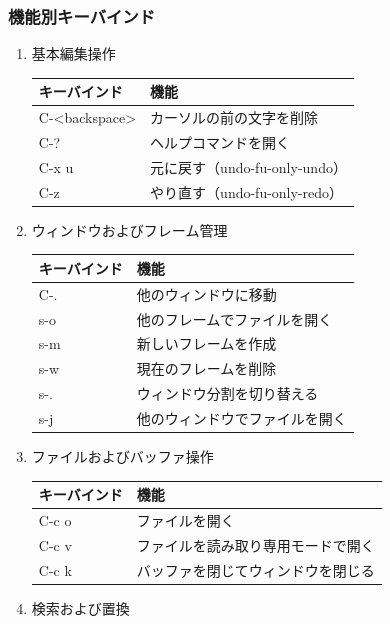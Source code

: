 \documentclass[11pt]{article}
\begin{document}
\subsubsection{機能別キーバインド}
\label{sec:orgd5e7649}
\begin{enumerate}
\item 基本編集操作
\label{sec:org70be987}
\begin{center}
\begin{tabular}{ll}
キーバインド & 機能\\
\hline
C-<backspace> & カーソルの前の文字を削除\\
C-? & ヘルプコマンドを開く\\
C-x u & 元に戻す（undo-fu-only-undo）\\
C-z & やり直す（undo-fu-only-redo）\\
\end{tabular}
\end{center}
\item ウィンドウおよびフレーム管理
\label{sec:org8e58915}
\begin{center}
\begin{tabular}{ll}
キーバインド & 機能\\
\hline
C-. & 他のウィンドウに移動\\
s-o & 他のフレームでファイルを開く\\
s-m & 新しいフレームを作成\\
s-w & 現在のフレームを削除\\
s-. & ウィンドウ分割を切り替える\\
s-j & 他のウィンドウでファイルを開く\\
\end{tabular}
\end{center}
\item ファイルおよびバッファ操作
\label{sec:orgfbdea40}
\begin{center}
\begin{tabular}{ll}
キーバインド & 機能\\
\hline
C-c o & ファイルを開く\\
C-c v & ファイルを読み取り専用モードで開く\\
C-c k & バッファを閉じてウィンドウを閉じる\\
\end{tabular}
\end{center}
\item 検索および置換
\label{sec:org4764bd8}
\begin{center}
\begin{tabular}{ll}

\end{tabular}
\end{center}
\end{enumerate}
\end{document}
